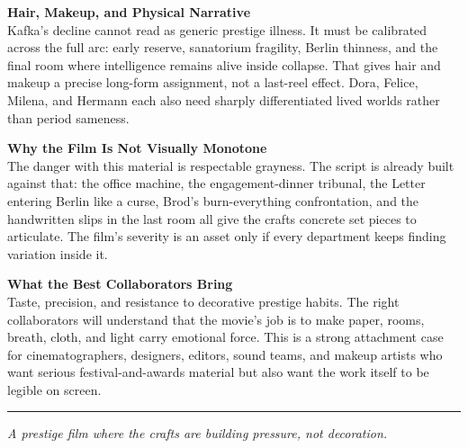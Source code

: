 \documentclass[11pt,letterpaper]{article}
\begin{document}
\vspace{2pt}

\textbf{Hair, Makeup, and Physical Narrative}\\
Kafka's decline cannot read as generic prestige illness. It must be calibrated across the full arc: early reserve, sanatorium fragility, Berlin thinness, and the final room where intelligence remains alive inside collapse. That gives hair and makeup a precise long-form assignment, not a last-reel effect. Dora, Felice, Milena, and Hermann each also need sharply differentiated lived worlds rather than period sameness.

\vspace{2pt}

\textbf{Why the Film Is Not Visually Monotone}\\
The danger with this material is respectable grayness. The script is already built against that: the office machine, the engagement-dinner tribunal, the Letter entering Berlin like a curse, Brod's burn-everything confrontation, and the handwritten slips in the last room all give the crafts concrete set pieces to articulate. The film's severity is an asset only if every department keeps finding variation inside it.

\vspace{2pt}

\textbf{What the Best Collaborators Bring}\\
Taste, precision, and resistance to decorative prestige habits. The right collaborators will understand that the movie's job is to make paper, rooms, breath, cloth, and light carry emotional force. This is a strong attachment case for cinematographers, designers, editors, sound teams, and makeup artists who want serious festival-and-awards material but also want the work itself to be legible on screen.

\vspace{4pt}
\textcolor{sectionrule}{\rule{\textwidth}{0.5pt}}
\vspace{2pt}
\begin{center}
{\small\color{kafkalight}\textit{A prestige film where the crafts are building pressure, not decoration.}}
\end{center}
\end{document}
